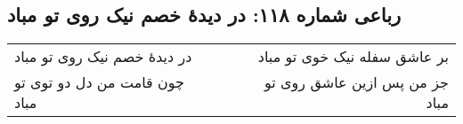 \begin{center}
\section*{رباعی شماره ۱۱۸: در دیدهٔ خصم نیک روی تو مباد}
\label{sec:sh118}
\begin{longtable}{l p{0.5cm} r}
در دیدهٔ خصم نیک روی تو مباد
&&
بر عاشق سفله نیک خوی تو مباد
\\
چون قامت من دل دو توی تو مباد
&&
جز من پس ازین عاشق روی تو مباد
\\
\end{longtable}
\end{center}
